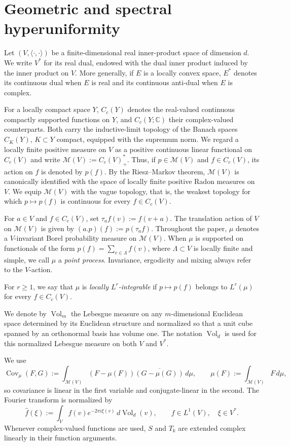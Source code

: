 \documentclass[11pt,reqno,a4paper]{amsart}
\numberwithin{equation}{section}
\theoremstyle{compact}
\theoremstyle{definition}
\theoremstyle{definition}
\newcommand{\Cov}{\operatorname{Cov}}
\newcommand{\Vol}{\operatorname{Vol}}
\newcommand{\cM}{\mathcal M}
\begin{document}
\section{Geometric and spectral hyperuniformity}
\label{sec:general-theory}

Let $(V,\langle\cdot,\cdot\rangle)$ be a finite-dimensional real inner-product
space of dimension $d$.  We write $V^*$ for its real dual, endowed with the
dual inner product induced by the inner product on $V$.  More generally, if $E$ is a
locally convex space, $E^*$ denotes its continuous dual when $E$ is real and
its continuous anti-dual when $E$ is complex.

For a locally compact space $Y$, $C_c(Y)$ denotes the real-valued continuous
compactly supported functions on $Y$, and $C_c(Y;\mathbb C)$ their
complex-valued counterparts.  Both carry the inductive-limit topology of
the Banach spaces $C_K(Y)$, $K\subset Y$ compact, equipped with the supremum
norm.  We regard a locally finite positive measure on $V$ as a positive
continuous linear functional on $C_c(V)$ and write
$\cM(V):=C_c(V)^*_+$.  Thus, if $p\in\cM(V)$ and
$f\in C_c(V)$, its action on $f$ is denoted by $p(f)$.  By the Riesz--Markov theorem, $\cM(V)$ is canonically identified with the
space of locally finite positive Radon measures on $V$.
We equip $\cM(V)$ with the vague topology, that is, the weakest topology for
which $p\mapsto p(f)$ is continuous for every $f\in C_c(V)$.

For $a\in V$ and $f\in C_c(V)$, set $\tau_a f(v):=f(v+a)$.  The translation
action of $V$ on $\cM(V)$ is given by $(a.p)(f):=p(\tau_a f)$.  Throughout
the paper, $\mu$ denotes a $V$-invariant Borel probability measure on
$\cM(V)$.  When $\mu$ is supported on functionals of the form
$p(f)=\sum_{v\in\Lambda}f(v)$, where $\Lambda\subset V$ is locally finite and
simple, we call $\mu$ a \emph{point process}.  Invariance, ergodicity and
mixing always refer to the $V$-action.

For $r\geq1$, we say that $\mu$ is \emph{locally $L^r$-integrable} if
$p\mapsto p(f)$ belongs to $L^r(\mu)$ for every $f\in C_c(V)$.

We denote by $\Vol_m$ the Lebesgue measure on any $m$-dimensional Euclidean
space determined by its Euclidean structure and normalized so that a unit
cube spanned by an orthonormal basis has volume one.  The notation $\Vol_d$ is used for this normalized Lebesgue measure on both
$V$ and $V^*$.

We use
\begin{equation}\label{eq:covariance-convention}
  \Cov_\mu(F,G)
  :=\int_{\cM(V)}(F-\mu(F))\overline{(G-\mu(G))}\,d\mu,
  \qquad \mu(F):=\int_{\cM(V)}F\,d\mu,
\end{equation}
so covariance is linear in the first variable and conjugate-linear in the
second.  The Fourier transform is normalized by
\begin{equation}\label{eq:fourier-convention}
  \widehat f(\xi)
  :=\int_V f(v)e^{-2\pi i\xi(v)}\,d\Vol_d(v),
  \qquad f\in L^1(V),\quad \xi\in V^*.
\end{equation}
Whenever complex-valued functions are used, $S$ and $T_k$ are extended
complex linearly in their function arguments.
\end{document}
